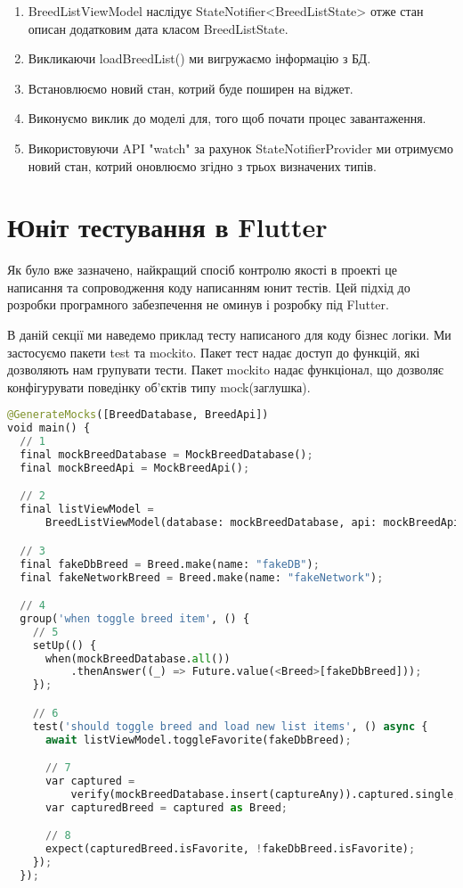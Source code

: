 \begin{enumerate}
    \item BreedListViewModel наслідує StateNotifier<BreedListState> отже стан описан додатковим дата класом BreedListState.
    \item Викликаючи loadBreedList() ми вигружаємо інформацію з БД.
    \item Встановлюємо новий стан, котрий буде поширен на віджет.
    \item Виконуємо виклик до моделі для, того щоб почати процес завантаження.
    \item Використовуючи API "watch" за рахунок StateNotifierProvider ми отримуємо новий стан, котрий оновлюємо згідно з трьох визначених типів.
\end{enumerate}


\section{Юніт тестування в Flutter}
\label{section.3.6}
Як було вже зазначено, найкращий спосіб контролю якості в проекті це написання та сопроводження коду написанням юнит тестів.
Цей підхід до розробки програмного забезпечення не оминув і розробку під Flutter.

В даній секції ми наведемо приклад тесту написаного для коду бізнес логіки.
Ми застосуємо пакети test та mockito.
Пакет тест надає доступ до функцій, які дозволяють нам групувати тести.
Пакет mockito надає функціонал, що дозволяє конфігурувати поведінку об'єктів типу mock(заглушка).
\begin{lstlisting}[style=light, language=Python,label={lst:flutter_unit_test},caption=Flutter Unit Test]
@GenerateMocks([BreedDatabase, BreedApi])
void main() {
  // 1
  final mockBreedDatabase = MockBreedDatabase();
  final mockBreedApi = MockBreedApi();

  // 2
  final listViewModel =
      BreedListViewModel(database: mockBreedDatabase, api: mockBreedApi);

  // 3
  final fakeDbBreed = Breed.make(name: "fakeDB");
  final fakeNetworkBreed = Breed.make(name: "fakeNetwork");

  // 4
  group('when toggle breed item', () {
    // 5
    setUp(() {
      when(mockBreedDatabase.all())
          .thenAnswer((_) => Future.value(<Breed>[fakeDbBreed]));
    });

    // 6
    test('should toggle breed and load new list items', () async {
      await listViewModel.toggleFavorite(fakeDbBreed);

      // 7
      var captured =
          verify(mockBreedDatabase.insert(captureAny)).captured.single;
      var capturedBreed = captured as Breed;

      // 8
      expect(capturedBreed.isFavorite, !fakeDbBreed.isFavorite);
    });
  });
\end{lstlisting}

